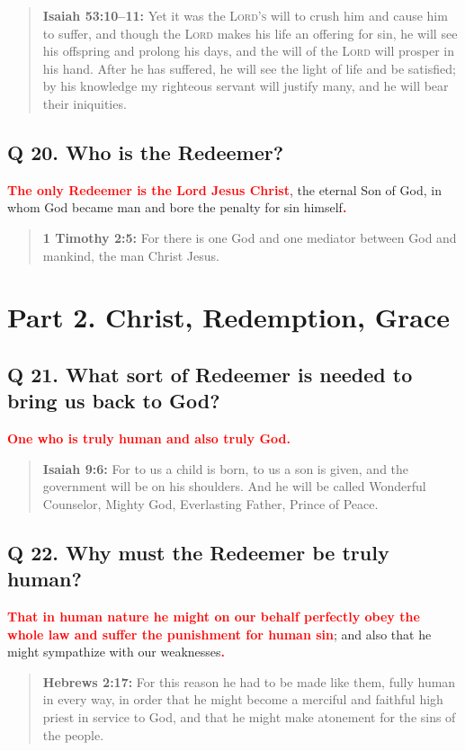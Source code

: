 \documentclass[]{memoir}
\newcommand\Children[1]{\textbf{\textcolor{red}{#1}}}
\newcommand\Quote[2]{\begin{quote}{\textbf{#1:}{ #2}}\end{quote}}
\begin{document}
\Quote{Isaiah 53:10--11}{Yet it was the \textsc{Lord's} will to crush him and cause him to suffer, and though the \textsc{Lord} makes his life an offering for sin, he will see his offspring and prolong his days, and the will of the \textsc{Lord} will prosper in his hand. After he has suffered, he will see the light of life and be satisfied; by his knowledge my righteous servant will justify many, and he will bear their iniquities.}

\subsection[Q 20. Who is the Redeemer?]{Q 20. Who is the Redeemer?}
\Children{The only Redeemer is the Lord Jesus Christ}, the eternal Son of God, in whom God became man and bore the penalty for sin himself\Children{.}

\Quote{1 Timothy 2:5}{For there is one God and one mediator between God and mankind, the man Christ Jesus.}


\section[Part 2. Christ, Redemption, Grace][Christ, Redemption, Grace]{Part 2. Christ, Redemption, Grace}

\subsection{Q 21. What sort of Redeemer is needed to bring us back to God?}
\Children{One who is truly human and also truly God.}

\Quote{Isaiah 9:6}{For to us a child is born, to us a son is given, and the government will be on his shoulders. And he will be called Wonderful Counselor, Mighty God, Everlasting Father, Prince of Peace.}

\subsection{Q 22. Why must the Redeemer be truly human?}
\Children{That in human nature he might on our behalf perfectly obey the whole law and suffer the punishment for human sin}; and also that he might sympathize with our weaknesses\Children{.}

\Quote{Hebrews 2:17}{For this reason he had to be made like them, fully human in every way, in order that he might become a merciful and faithful high priest in service to God, and that he might make atonement for the sins of the people.}
\end{document}
